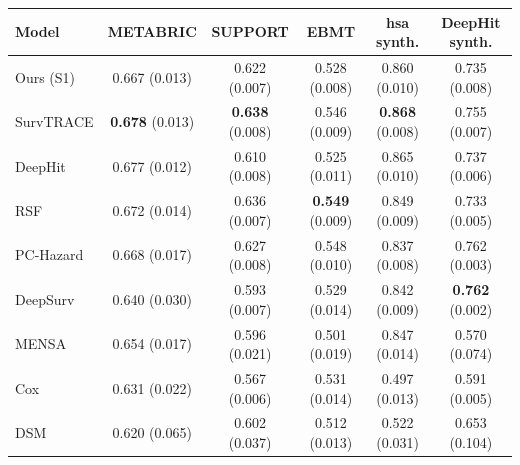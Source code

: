 \begin{tabular}{lccccc}
\toprule
Model & METABRIC & SUPPORT & EBMT & hsa synth. & DeepHit synth. \\
\midrule
Ours (S1) & 0.667 (0.013) & 0.622 (0.007) & 0.528 (0.008) & 0.860 (0.010) & 0.735 (0.008) \\
SurvTRACE & \textbf{0.678} (0.013) & \textbf{0.638} (0.008) & 0.546 (0.009) & \textbf{0.868} (0.008) & 0.755 (0.007) \\
DeepHit & 0.677 (0.012) & 0.610 (0.008) & 0.525 (0.011) & 0.865 (0.010) & 0.737 (0.006) \\
RSF & 0.672 (0.014) & 0.636 (0.007) & \textbf{0.549} (0.009) & 0.849 (0.009) & 0.733 (0.005) \\
PC-Hazard & 0.668 (0.017) & 0.627 (0.008) & 0.548 (0.010) & 0.837 (0.008) & 0.762 (0.003) \\
DeepSurv & 0.640 (0.030) & 0.593 (0.007) & 0.529 (0.014) & 0.842 (0.009) & \textbf{0.762} (0.002) \\
MENSA & 0.654 (0.017) & 0.596 (0.021) & 0.501 (0.019) & 0.847 (0.014) & 0.570 (0.074) \\
Cox & 0.631 (0.022) & 0.567 (0.006) & 0.531 (0.014) & 0.497 (0.013) & 0.591 (0.005) \\
DSM & 0.620 (0.065) & 0.602 (0.037) & 0.512 (0.013) & 0.522 (0.031) & 0.653 (0.104) \\
\bottomrule
\end{tabular}
